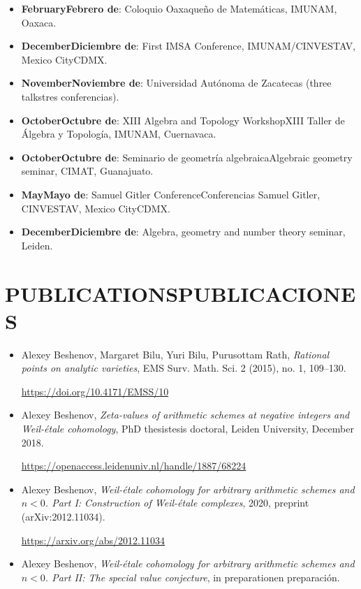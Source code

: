 \documentclass{article}
\newcommand{\biling}[2]{\ifdefined\english#1\fi\ifdefined\spanish#2\fi}
\begin{document}
\begin{itemize}
\item \textbf{\biling{February}{Febrero de} 2020}: Coloquio Oaxaqueño de Matemáticas,
  IMUNAM, Oaxaca.

\item \textbf{\biling{December}{Diciembre de} 2019}: First IMSA Conference,
  IMUNAM/CINVESTAV, \biling{Mexico City}{CDMX}.

\item \textbf{\biling{November}{Noviembre de} 2019}: Universidad Autónoma de Zacatecas
  (\biling{three talks}{tres conferencias}).

\item \textbf{\biling{October}{Octubre de} 2019}: \biling{XIII Algebra and Topology Workshop}{XIII Taller de Álgebra y Topología},
  IMUNAM, Cuernavaca.

\item \textbf{\biling{October}{Octubre de} 2019}: \biling{Seminario de geometría algebraica}{Algebraic geometry seminar},
  CIMAT, Guanajuato.

\item \textbf{\biling{May}{Mayo de} 2019}: \biling{Samuel Gitler Conference}{Conferencias Samuel Gitler},
  CINVESTAV, \biling{Mexico City}{CDMX}.

\item \textbf{\biling{December}{Diciembre de} 2017}:
  Algebra, geometry and number theory seminar, Leiden.
\end{itemize}

{\color{RoyalBlue}\section*{\biling{PUBLICATIONS}{PUBLICACIONES}}}

\begin{itemize}
\item Alexey Beshenov, Margaret Bilu, Yuri Bilu, Purusottam Rath,
  \emph{Rational points on analytic varieties},
  EMS Surv. Math. Sci. 2 (2015), no. 1, 109–130.

  \url{https://doi.org/10.4171/EMSS/10}

\item Alexey Beshenov,
  \emph{Zeta-values of arithmetic schemes at negative integers and Weil-étale cohomology},
  \biling{PhD thesis}{tesis doctoral}, Leiden University, December 2018.

  \url{https://openaccess.leidenuniv.nl/handle/1887/68224}

\item Alexey Beshenov,
  \emph{Weil-étale cohomology for arbitrary arithmetic schemes and $n < 0$.
    Part I: Construction of Weil-étale complexes},
  2020, preprint (arXiv:2012.11034).

  \url{https://arxiv.org/abs/2012.11034}

\item Alexey Beshenov,
  \emph{Weil-étale cohomology for arbitrary arithmetic schemes and $n < 0$.
    Part II: The special value conjecture},
  \biling{in preparation}{en preparación}.
\end{itemize}
\end{document}
